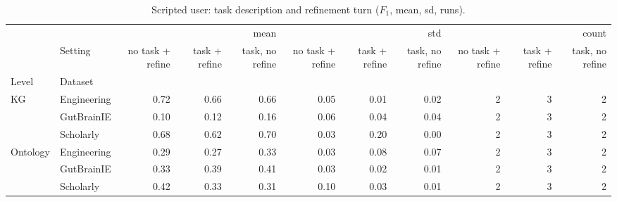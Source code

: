 \begin{table}
\caption{Scripted user: task description and refinement turn ($F_1$, mean, sd, runs).}
\label{tab:onto_ablation}
\begin{tabular}{llrrrrrrrrr}
\toprule
 &  & \multicolumn{3}{r}{mean} & \multicolumn{3}{r}{std} & \multicolumn{3}{r}{count} \\
 & Setting & no task + refine & task + refine & task, no refine & no task + refine & task + refine & task, no refine & no task + refine & task + refine & task, no refine \\
Level & Dataset &  &  &  &  &  &  &  &  &  \\
\midrule
\multirow[t]{3}{*}{KG} & Engineering & 0.72 & 0.66 & 0.66 & 0.05 & 0.01 & 0.02 & 2 & 3 & 2 \\
 & GutBrainIE & 0.10 & 0.12 & 0.16 & 0.06 & 0.04 & 0.04 & 2 & 3 & 2 \\
 & Scholarly & 0.68 & 0.62 & 0.70 & 0.03 & 0.20 & 0.00 & 2 & 3 & 2 \\
\cline{1-11}
\multirow[t]{3}{*}{Ontology} & Engineering & 0.29 & 0.27 & 0.33 & 0.03 & 0.08 & 0.07 & 2 & 3 & 2 \\
 & GutBrainIE & 0.33 & 0.39 & 0.41 & 0.03 & 0.02 & 0.01 & 2 & 3 & 2 \\
 & Scholarly & 0.42 & 0.33 & 0.31 & 0.10 & 0.03 & 0.01 & 2 & 3 & 2 \\
\cline{1-11}
\bottomrule
\end{tabular}
\end{table}
